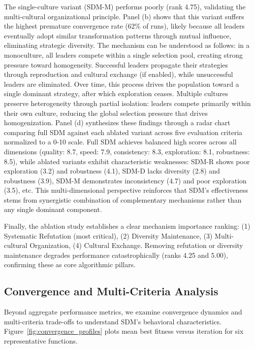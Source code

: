 \documentclass[11pt]{article}
\begin{document}
The single-culture variant (SDM-M) performs poorly (rank 4.75), validating the multi-cultural organizational principle. Panel (b) shows that this variant suffers the highest premature convergence rate (62\% of runs), likely because all leaders eventually adopt similar transformation patterns through mutual influence, eliminating strategic diversity. The mechanism can be understood as follows: in a monoculture, all leaders compete within a single selection pool, creating strong pressure toward homogeneity. Successful leaders propagate their strategies through reproduction and cultural exchange (if enabled), while unsuccessful leaders are eliminated. Over time, this process drives the population toward a single dominant strategy, after which exploration ceases. Multiple cultures preserve heterogeneity through partial isolation: leaders compete primarily within their own culture, reducing the global selection pressure that drives homogenization.
Panel (d) synthesizes these findings through a radar chart comparing full SDM against each ablated variant across five evaluation criteria normalized to a 0-10 scale. Full SDM achieves balanced high scores across all dimensions (quality: 8.7, speed: 7.9, consistency: 8.3, exploration: 8.1, robustness: 8.5), while ablated variants exhibit characteristic weaknesses: SDM-R shows poor exploration (3.2) and robustness (4.1), SDM-D lacks diversity (2.8) and robustness (3.9), SDM-M demonstrates inconsistency (4.7) and poor exploration (3.5), etc. This multi-dimensional perspective reinforces that SDM's effectiveness stems from synergistic combination of complementary mechanisms rather than any single dominant component.

Finally, the ablation study establishes a clear mechanism importance ranking: (1) Systematic Refutation (most critical), (2) Diversity Maintenance, (3) Multi-cultural Organization, (4) Cultural Exchange. Removing refutation or diversity maintenance degrades performance catastrophically (ranks 4.25 and 5.00), confirming these as core algorithmic pillars.

\subsection{Convergence and Multi-Criteria Analysis}
\label{sec:convergence}

Beyond aggregate performance metrics, we examine convergence dynamics and multi-criteria trade-offs to understand SDM's behavioral characteristics. Figure~\ref{fig:convergence_profiles} plots mean best fitness versus iteration for six representative functions.
\end{document}

